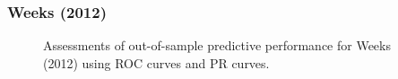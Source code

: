 \clearpage
\subsubsection*{Weeks (2012)}



\FloatBarrier

\begin{figure}
	\centering   
	\caption{Assessments of out-of-sample predictive performance for Weeks (2012) using ROC curves and PR curves.}
\end{figure}
\FloatBarrier